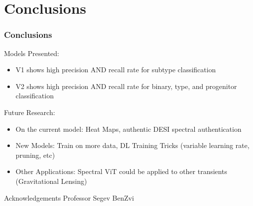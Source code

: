 \section{Conclusions}
\begin{frame}
    \frametitle{Conclusions}
    Models Presented:
    \begin{itemize}
        \item V1 shows high precision AND recall rate for subtype classification
        \item V2 shows high precision AND recall rate for binary, type, and progenitor classification
    \end{itemize}
    \pause
    Future Research:
    \begin{itemize}
        \item On the current model: Heat Maps, authentic DESI spectral authentication
        \item New Models: Train on more data, DL Training Tricks (variable learning rate, pruning, etc)
        \item Other Applications: Spectral ViT could be applied to other transients (Gravitational Lensing)
    \end{itemize}
\end{frame}

\begin{frame}{Acknowledgements}
    Professor Segev BenZvi
\end{frame}